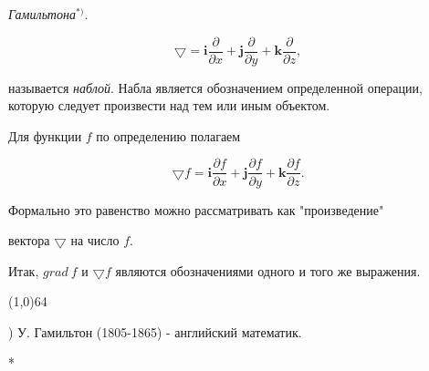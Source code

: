 \documentclass[a4paper,12pt]{book}
\begin{document}
\parindent=0.0cm
\textit{Гамильтона$^{*)}$}.\par
$$
\bigtriangledown = \textbf{i} \frac{\partial}{\partial x} + \textbf{j} \frac{\partial}{\partial y} + \textbf{k} \frac{\partial}{\partial z},
$$\par
\parindent=0.0cm
называется \textit{наблой}. Набла является обозначением определенной операции, которую следует произвести над тем или иным объектом.\par
\parindent=0.7cm
Для функции $f$ по определению полагаем\par
$$
\bigtriangledown f = \textbf{i} \frac{\partial f}{\partial x} + \textbf{j} \frac{\partial f}{\partial y} + \textbf{k} \frac{\partial f}{\partial z}.
$$\par
Формально это равенство можно рассматривать как "произведение"\par
\parindent=0.0cm
вектора $\bigtriangledown$ на число $f$.\par
\parindent=0.7cm
Итак, $grad\ f$ и $\bigtriangledown f$ являются обозначениями одного и того же выражения.\par
\line(1,0){64}\par
\small *) У. Гамильтон (1805-1865) - английский математик.\par
\qquad \qquad \qquad \qquad \qquad \qquad \qquad \qquad \qquad \qquad \qquad {}*
\end{document}
